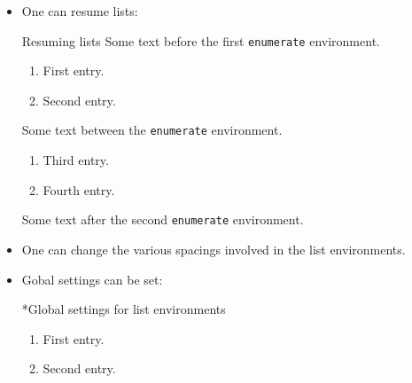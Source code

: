 \begin{itemize}
  \item
    One can resume lists:
    \begin{showlatex}{Resuming lists}
Some text before the first \texttt{enumerate} environment.
\begin{enumerate}
  \item
    First entry.
  \item
    Second entry.
\end{enumerate}
Some text between the \texttt{enumerate} environment.
\begin{enumerate}[resume]
  \item
    Third entry.
  \item
    Fourth entry.
\end{enumerate}
Some text after the second \texttt{enumerate} environment.
    \end{showlatex}
    
  \item
    One can change the various spacings involved in the list environments.

  \item
    Gobal settings can be set:
    \begin{showlatex}*{Global settings for list environments}
\begin{enumerate}
  \item
    First entry.
  \item
    Second entry.
\end{enumerate}
    \end{showlatex}
    

\end{itemize}
